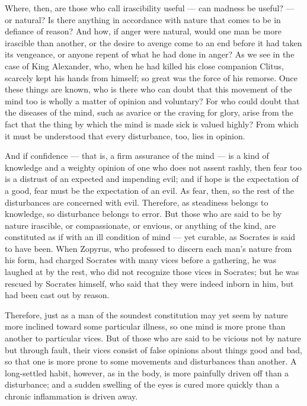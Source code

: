  Where, then, are those who call irascibility useful — can madness be useful? — or natural? Is there anything in accordance with nature that comes to be in defiance of reason? And how, if anger were natural, would one man be more irascible than another, or the desire to avenge come to an end before it had taken its vengeance, or anyone repent of what he had done in anger? As we see in the case of King Alexander, who, when he had killed his close companion Clitus, scarcely kept his hands from himself; so great was the force of his remorse. Once these things are known, who is there who can doubt that this movement of the mind too is wholly a matter of opinion and voluntary? For who could doubt that the diseases of the mind, such as avarice or the craving for glory, arise from the fact that the thing by which the mind is made sick is valued highly? From which it must be understood that every disturbance, too, lies in opinion.

 And if confidence — that is, a firm assurance of the mind — is a kind of knowledge and a weighty opinion of one who does not assent rashly, then fear too is a distrust of an expected and impending evil; and if hope is the expectation of a good, fear must be the expectation of an evil. As fear, then, so the rest of the disturbances are concerned with evil. Therefore, as steadiness belongs to knowledge, so disturbance belongs to error. But those who are said to be by nature irascible, or compassionate, or envious, or anything of the kind, are constituted as if with an ill condition of mind — yet curable, as Socrates is said to have been. When Zopyrus, who professed to discern each man's nature from his form, had charged Socrates with many vices before a gathering, he was laughed at by the rest, who did not recognize those vices in Socrates; but he was rescued by Socrates himself, who said that they were indeed inborn in him, but had been cast out by reason.

 Therefore, just as a man of the soundest constitution may yet seem by nature more inclined toward some particular illness, so one mind is more prone than another to particular vices. But of those who are said to be vicious not by nature but through fault, their vices consist of false opinions about things good and bad, so that one is more prone to some movements and disturbances than another. A long-settled habit, however, as in the body, is more painfully driven off than a disturbance; and a sudden swelling of the eyes is cured more quickly than a chronic inflammation is driven away.

